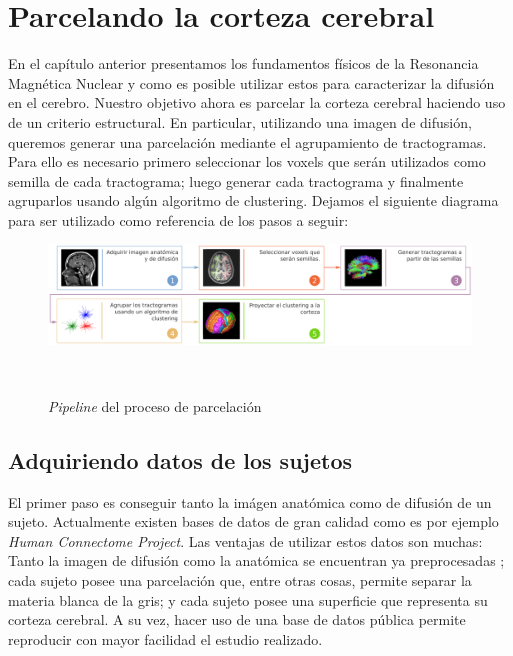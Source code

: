 \chapter{Parcelando la corteza cerebral}
\label{ch:metodos}

En el cap\'itulo anterior presentamos los fundamentos f\'isicos de la Resonancia
Magn\'etica Nuclear y como es posible utilizar estos para caracterizar la 
difusi\'on en el cerebro. Nuestro objetivo ahora es parcelar la corteza cerebral
haciendo uso de un criterio estructural. En particular, utilizando una imagen de
difusi\'on, queremos generar una parcelaci\'on mediante el agrupamiento de
tractogramas. Para ello es necesario primero seleccionar los voxels que ser\'an
utilizados como semilla de cada tractograma; luego generar cada tractograma y
finalmente agruparlos usando alg\'un algoritmo de clustering. Dejamos el siguiente
diagrama para ser utilizado como referencia de los pasos a seguir: \\

\begin{figure}[h!]

\centering
\begin{minipage}[b]{\textwidth}
    \includegraphics[width=\textwidth]{img/diagrama.png}
    \caption{\small \textit{Pipeline} del proceso de parcelaci\'on }
    \label{fig:diagrama}
\end{minipage} ~

\end{figure}  

\section{Adquiriendo datos de los sujetos}
\label{sec:hcp}

El primer paso es conseguir tanto la im\'agen anat\'omica como de difusi\'on de 
un sujeto. Actualmente existen bases de datos de gran calidad como es por ejemplo
\textit{Human Connectome Project}. Las ventajas de utilizar estos datos son muchas:
Tanto la imagen de difusi\'on como la anat\'omica se encuentran ya preprocesadas
\cite{Glasser2013}; cada sujeto posee una parcelaci\'on que, entre otras cosas,
permite separar la materia blanca de la gris; y cada sujeto posee una superficie
que representa su corteza cerebral. A su vez, hacer uso de una base de datos
p\'ublica permite reproducir con mayor facilidad el estudio realizado.\\






